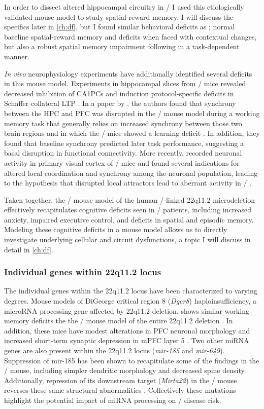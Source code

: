 In order to dissect altered hippocampal circuitry in \scz/ I used this etiologically validated mouse model to study spatial-reward memory.
I will discuss the specifics later in \autoref{ch:df}, but I found similar behavioral deficits as \citeauthor{Drew2011b}; normal baseline spatial-reward memory and deficits when faced with contextual changes, but also a robust spatial memory impairment following in a task-dependent manner.

\emph{In vivo} neurophysiology experiments have additionally identified several deficits in this mouse model.
Experiments in hippocampal slices from \df/ mice revealed decreased inhibition of CA1PCs and induction protocol-specific deficits in Schaffer collateral LTP \citep{Drew2011b}.
In a paper by \citeauthor{Sigurdsson2010}, the authors found that synchrony between the \ac{HPC} and \ac{PFC} was disrupted in the \df/ mouse model during a working memory task that generally relies on increased synchrony between those two brain regions and in which the \df/ mice showed a learning deficit \citep{Sigurdsson2010}.
In addition, they found that baseline synchrony predicted later task performance, suggesting a basal disruption in functional connectivity.
More recently, \citeauthor{Hamm2017} recorded neuronal activity in primary visual cortex of \df/ mice and found several indications for altered local coordination and synchrony among the neuronal population, leading to the hypothesis that disrupted local attractors lead to aberrant activity in \scz/ \citep{Hamm2017}.

Taken together, the \df/ mouse model of the human \scz/-linked 22q11.2 microdeletion effectively recapitulates cognitive deficits seen in \scz/ patients, including increased anxiety, impaired executive control, and deficits in spatial and episodic memory.
Modeling these cognitive deficits in a mouse model allows us to directly investigate underlying cellular and circuit dysfunctions, a topic I will discuss in detail in \autoref{ch:df}.

\subsubsection{Individual genes within 22q11.2 locus}
The individual genes within the 22q11.2 locus have been characterized to varying degrees.
Mouse models of DiGeorge critical region 8 (\emph{Dgcr8}) haploinsufficiency, a microRNA processing gene affected by 22q11.2 deletion, shows similar working memory deficits the the \df/ mouse model of the entire 22q11.2 deletion \citep{Stark2008}.
In addition, these mice have modest alterations in \ac{PFC} neuronal morphology and increased short-term synaptic depression in mPFC layer 5 \citep{Fenelon2011}.
Two other miRNA genes are also present within the 22q11.2 locus (\emph{mir-185} and \emph{mir-649}).
Suppression of mir-185 has been shown to recapitulate some of the findings in the \df/ mouse, including simpler dendritic morphology and decreased spine density \citep{Xu2013a}.
Additionally, repression of its downstream target (\emph{Mirta22}) in the \df/ mouse reverses these same structural abnormalities \citep{Xu2013a}.
Collectively these mutations highlight the potential impact of miRNA processing on \scz/ disease risk.

